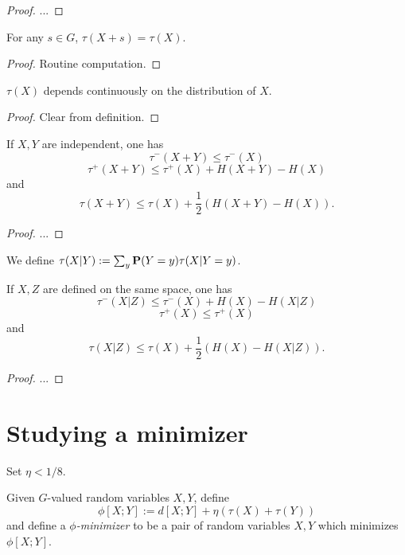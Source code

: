 \begin{proof} ...
\end{proof}

\begin{lemma}\label{tau-invariant}  For any $s \in G$, $\tau(X+s) = \tau(X)$.
\end{lemma}

\begin{proof} Routine computation.
\end{proof}

\begin{lemma}\label{tau-cts} $\tau(X)$ depends continuously on the distribution of $X$.
\end{lemma}

\begin{proof}  Clear from definition.
\end{proof}

\begin{lemma}\label{tau-sums}  If $X,Y$ are independent, one has
  $$ \tau^-(X+Y) \leq \tau^-(X)$$
  $$ \tau^+(X+Y) \leq \tau^+(X) + H(X+Y) - H(X)$$
and
  $$ \tau(X+Y) \leq \tau(X) + \frac{1}{2}( H(X+Y) - H(X) ).$$
\end{lemma}

\begin{proof}
  ...
\end{proof}


\begin{definition}  We define $\tau(X|Y) := \sum_y {\bf P}(Y=y) \tau(X|Y=y)$.
\end{definition}

\begin{lemma}  If $X,Z$ are defined on the same space, one has
  $$ \tau^-(X|Z) \leq \tau^-(X) + H(X) - H(X|Z)$$
  $$ \tau^+(X) \leq \tau^+(X)$$
and
  $$ \tau(X|Z) \leq \tau(X) + \frac{1}{2}( H(X) - H(X|Z) ).$$
\end{lemma}

\begin{proof}
  ...
\end{proof}


\section{Studying a minimizer}

Set $\eta < 1/8$.

\begin{definition}  Given $G$-valued random variables $X,Y$, define
$$ \phi[X;Y] := d[X;Y] + \eta(\tau(X) + \tau(Y))$$
and define a \emph{$\phi$-minimizer} to be a pair of random variables $X,Y$ which minimizes $\phi[X;Y]$.
\end{definition}

